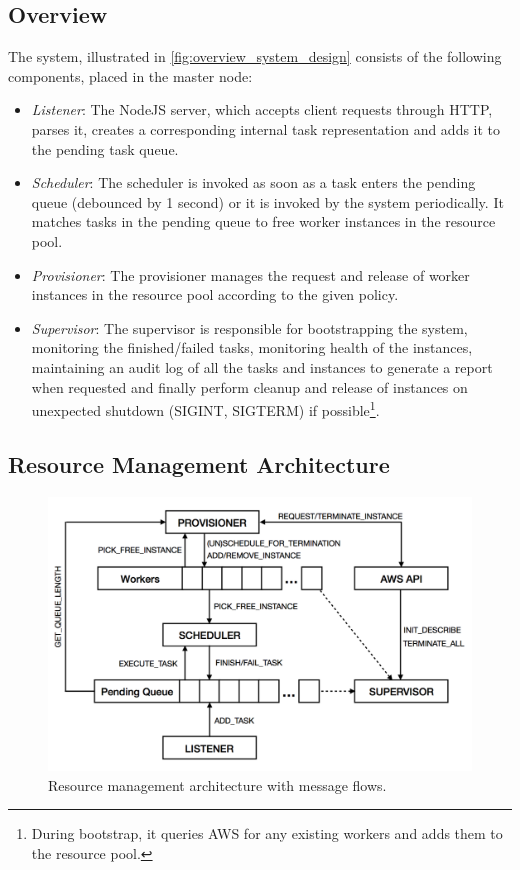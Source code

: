 \documentclass[a4paper]{IEEEtran}
\begin{document}
\subsection{Overview} \label{system_design_overview}

The system, illustrated in \autoref{fig:overview_system_design} consists of the following components, placed in the master node:

 \begin{itemize}
   \item \emph{Listener}: The NodeJS server, which accepts client requests through HTTP, parses it, creates a 
   corresponding internal task representation and adds it to the pending task queue.
   \item \emph{Scheduler}: The scheduler is invoked as soon as a task enters the pending queue (debounced by 1 second) or it is invoked by the system periodically. It matches tasks in the pending queue to free worker instances in the resource pool.
   \item \emph{Provisioner}: The provisioner manages the request and release of worker instances in the resource 
   pool according to the given policy.
   \item \emph{Supervisor}: The supervisor is responsible for bootstrapping the system, monitoring the finished/failed tasks, monitoring health of the instances, maintaining an audit log of all the tasks and instances to generate a report when requested and finally perform cleanup and release of instances on unexpected shutdown (SIGINT, SIGTERM)
   if possible\footnote{During bootstrap, it queries AWS for any existing workers and adds them to the resource pool.}.
 \end{itemize}

\subsection{Resource Management Architecture}
 
\begin{figure}[bp]
  \centering
    \includegraphics[width=\columnwidth]{resource-management.png}
  \caption{Resource management architecture with message flows.}
  \label{fig:resource_management}
\end{figure}
\end{document}
